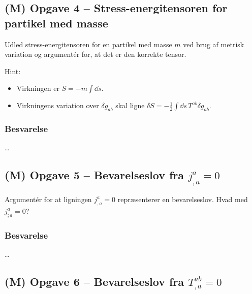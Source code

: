 \documentclass[../main.tex]{subfiles}
\begin{document}

\subsection{(M) Opgave 4 -- Stress-energitensoren for partikel med masse}
\setcounter{subsection}{4}
\setcounter{equation}{0}

Udled stress-energitensoren for en partikel med masse $m$ ved brug af metrisk variation og argumentér for, at det er den korrekte tensor.

Hint:
\begin{itemize}
    \item Virkningen er $S = - m \int \dd s$.
    \item Virkningens variation over $\delta g_{ab}$ skal ligne $\delta S = - \frac{1}{2} \int \dd s\, T^{ab} \delta g_{ab}$.
\end{itemize}


\subsubsection{Besvarelse}

\ldots




\subsection{(M) Opgave 5 -- Bevarelseslov fra $j^a_{,a} = 0$}
\setcounter{subsection}{5}
\setcounter{equation}{0}

Argumentér for at ligningen $j^a_{,a} = 0$ repræsenterer en bevarelseslov. Hvad med $j^a_{;a} = 0$?


\subsubsection{Besvarelse}

\ldots




\subsection{(M) Opgave 6 -- Bevarelseslov fra $T^{ab}_{,a} = 0$}
\setcounter{subsection}{6}
\setcounter{equation}{0}
\end{document}
